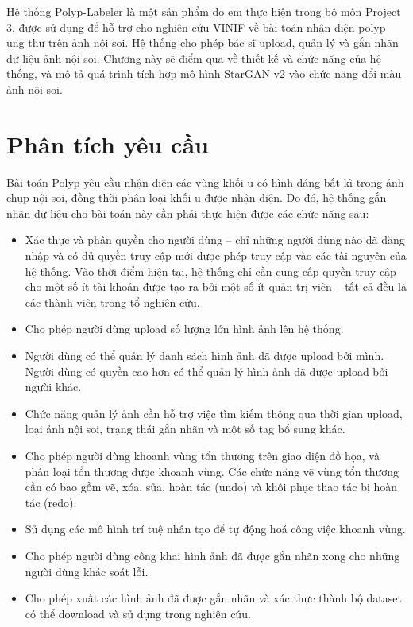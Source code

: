 \documentclass[12pt]{extreport}
\begin{document}
Hệ thống Polyp-Labeler là một sản phẩm do em thực hiện trong bộ môn Project 3, được sử dụng để hỗ trợ cho nghiên cứu VINIF về bài toán nhận diện polyp ung thư trên ảnh nội soi. Hệ thống cho phép bác sĩ upload, quản lý và gắn nhãn dữ liệu ảnh nội soi. Chương này sẽ điểm qua về thiết kế và chức năng của hệ thống, và mô tả quá trình tích hợp mô hình StarGAN v2 vào chức năng đổi màu ảnh nội soi.

\section{Phân tích yêu cầu}

Bài toán Polyp yêu cầu nhận diện các vùng khối u có hình dáng bất kì trong ảnh chụp nội soi, đồng thời phân loại khối u được nhận diện. Do đó, hệ thống gắn nhãn dữ liệu cho bài toán này cần phải thực hiện được các chức năng sau:
\begin{itemize}
    \item Xác thực và phân quyền cho người dùng – chỉ những người dùng nào đã đăng nhập và có đủ quyền truy cập mới được phép truy cập vào các tài nguyên của hệ thống. Vào thời điểm hiện tại, hệ thống chỉ cần cung cấp quyền truy cập cho một số ít tài khoản được tạo ra bởi một số ít quản trị viên – tất cả đều là các thành viên trong tổ nghiên cứu.
    \item Cho phép người dùng upload số lượng lớn hình ảnh lên hệ thống.
    \item Người dùng có thể quản lý danh sách hình ảnh đã được upload bởi mình. Người dùng có quyền cao hơn có thể quản lý hình ảnh đã được upload bởi người khác.
    \item Chức năng quản lý ảnh cần hỗ trợ việc tìm kiếm thông qua thời gian upload, loại ảnh nội soi, trạng thái gắn nhãn và một số tag bổ sung khác.
    \item Cho phép người dùng khoanh vùng tổn thương trên giao diện đồ họa, và phân loại tổn thương được khoanh vùng. Các chức năng vẽ vùng tổn thương cần có bao gồm vẽ, xóa, sửa, hoàn tác (undo) và khôi phục thao tác bị hoàn tác (redo).
    \item Sử dụng các mô hình trí tuệ nhân tạo để tự động hoá công việc khoanh vùng.
    \item Cho phép người dùng công khai hình ảnh đã được gắn nhãn xong cho những người dùng khác soát lỗi.
    \item Cho phép xuất các hình ảnh đã được gắn nhãn và xác thực thành bộ dataset có thể download và sử dụng trong nghiên cứu.
\end{itemize}
\end{document}
